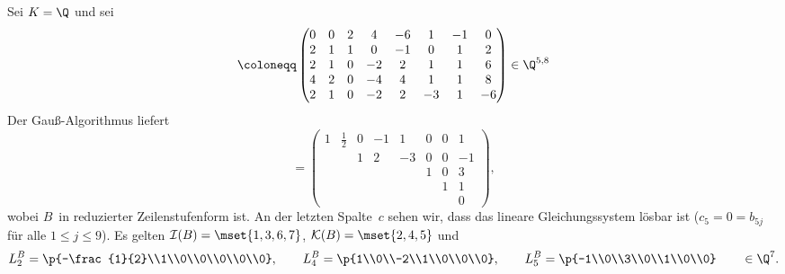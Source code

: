 \documentclass[a4paper]{article}
\begin{document}
\begin{example}
    Sei $K = \Q$ und sei
    \begin{equation*}
        [A|b] \coloneqq \begin{pmatrix}
            0 & 0 & 2 & 4  & -6 & 1  & -1 & 0  \\
            2 & 1 & 1 & 0  & -1 & 0  & 1  & 2  \\
            2 & 1 & 0 & -2 & 2  & 1  & 1  & 6  \\
            4 & 2 & 0 & -4 & 4  & 1  & 1  & 8  \\
            2 & 1 & 0 & -2 & 2  & -3 & 1  & -6
        \end{pmatrix} \in \Q^{5, 8}
    \end{equation*}
    Der Gauß-Algorithmus liefert
    \begin{equation*}
        [B|c] = \begin{pmatrix}
            1 & \frac{1}{2} & 0 & -1 & 1  & 0 & 0 & 1  \\
              &             & 1 & 2  & -3 & 0 & 0 & -1 \\
              &             &   &    &    & 1 & 0 & 3  \\
              &             &   &    &    &   & 1 & 1  \\
              &             &   &    &    &   &   & 0
        \end{pmatrix},
    \end{equation*}
    wobei $B$~in reduzierter Zeilenstufenform ist. An der letzten Spalte~$c$ sehen wir, dass das lineare Gleichungssystem lösbar ist ($c_5 = 0 = b_{5j}$ für alle $1 \leq j \leq 9$). Es gelten $\mathcal{I}(B) = \mset{1, 3, 6, 7}$, $\mathcal{K}(B) = \mset{2, 4, 5}$ und
    \begin{equation*}
        L_2^B = \p{-\frac{1}{2}\\1\\0\\0\\0\\0\\0},\qquad
        L_4^B = \p{1\\0\\-2\\1\\0\\0\\0},\qquad
        L_5^B = \p{-1\\0\\3\\0\\1\\0\\0} \qquad\in \Q^7.

\end{equation*}
\end{example}
\end{document}
